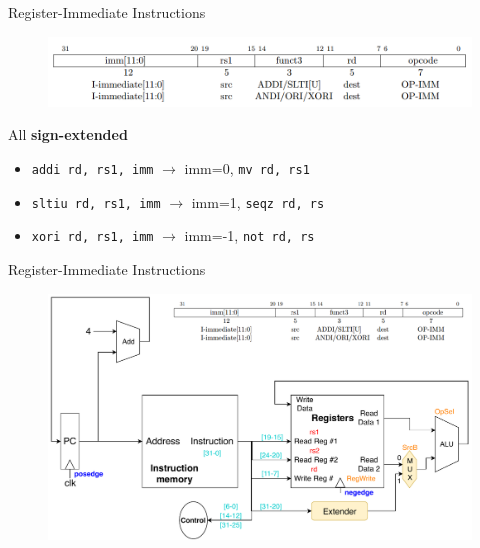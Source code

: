 \documentclass[UTF8]{ctexbeamer}
\begin{document}
\begin{frame}[fragile]{Register-Immediate Instructions}
\begin{figure}
\centering
\includegraphics[width=\linewidth]{fig/Lecture2/r-i.PNG}
\end{figure}
All \textbf{sign-extended}
\begin{itemize}
	\item \verb'addi rd, rs1, imm' $\to$ imm=0, \verb'mv rd, rs1'
	\item \verb'sltiu rd, rs1, imm' $\to$ imm=1, \verb'seqz rd, rs'
	\item \verb'xori rd, rs1, imm' $\to$ imm=-1, \verb'not rd, rs'
\end{itemize}
\end{frame}

\begin{frame}[fragile]{Register-Immediate Instructions}
\begin{figure}
\centering
\includegraphics[width=\linewidth]{fig/Lecture2/Datapath-R-I.pdf}
\end{figure}
\end{frame}
\end{document}
